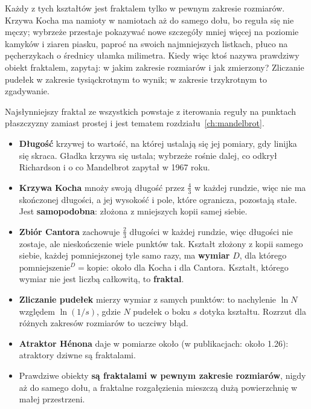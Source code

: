 \noindent
Każdy z tych kształtów jest fraktalem tylko w pewnym zakresie rozmiarów.
Krzywa Kocha ma namioty w namiotach aż do samego dołu, bo reguła się nie
męczy; wybrzeże przestaje pokazywać nowe szczegóły mniej więcej na poziomie
kamyków i ziaren piasku, paproć na swoich najmniejszych listkach, płuco na
pęcherzykach o średnicy ułamka milimetra. Kiedy więc ktoś nazywa prawdziwy
obiekt fraktalem, zapytaj: w jakim zakresie rozmiarów i jak zmierzony?
Zliczanie pudełek w zakresie tysiąckrotnym to wynik; w zakresie
trzykrotnym to zgadywanie.

Najsłynniejszy fraktal ze wszystkich powstaje z iterowania reguły na
punktach płaszczyzny zamiast prostej i jest tematem
rozdziału~\ref{ch:mandelbrot}.

\begin{summarybox}
\begin{itemize}
\item \textbf{Długość} krzywej to wartość, na której ustalają się jej
  pomiary, gdy linijka się skraca. Gładka krzywa się ustala; wybrzeże rośnie
  dalej, co odkrył Richardson i o co Mandelbrot zapytał w 1967 roku.
\item \textbf{Krzywa Kocha} mnoży swoją długość przez $\tfrac{4}{3}$ w każdej
  rundzie, więc nie ma skończonej długości, a jej wysokość i pole, które
  ogranicza, pozostają stałe. Jest \textbf{samopodobna}: złożona z mniejszych
  kopii samej siebie.
\item \textbf{Zbiór Cantora} zachowuje $\tfrac{2}{3}$ długości w każdej
  rundzie, więc długości nie zostaje, ale nieskończenie wiele punktów tak.
  Kształt złożony z kopii samego siebie, każdej pomniejszonej tyle samo
  razy, ma \textbf{wymiar} $D$, dla którego
  $\text{pomniejszenie}^{D} = \text{kopie}$: około  dla
  Kocha i  dla Cantora. Kształt, którego wymiar nie
  jest liczbą całkowitą, to \textbf{fraktal}.
\item \textbf{Zliczanie pudełek} mierzy wymiar z samych punktów: to
  nachylenie $\ln N$ względem $\ln(1/s)$, gdzie $N$ pudełek o boku $s$
  dotyka kształtu. Rozrzut dla różnych zakresów rozmiarów to uczciwy błąd.
\item \textbf{Atraktor Hénona} daje w pomiarze około 
  (w publikacjach: około \num{1.26}): atraktory dziwne są fraktalami.
\item Prawdziwe obiekty \textbf{są fraktalami w pewnym zakresie rozmiarów},
  nigdy aż do samego dołu, a fraktalne rozgałęzienia mieszczą dużą
  powierzchnię w małej przestrzeni.
\end{itemize}
\end{summarybox}

